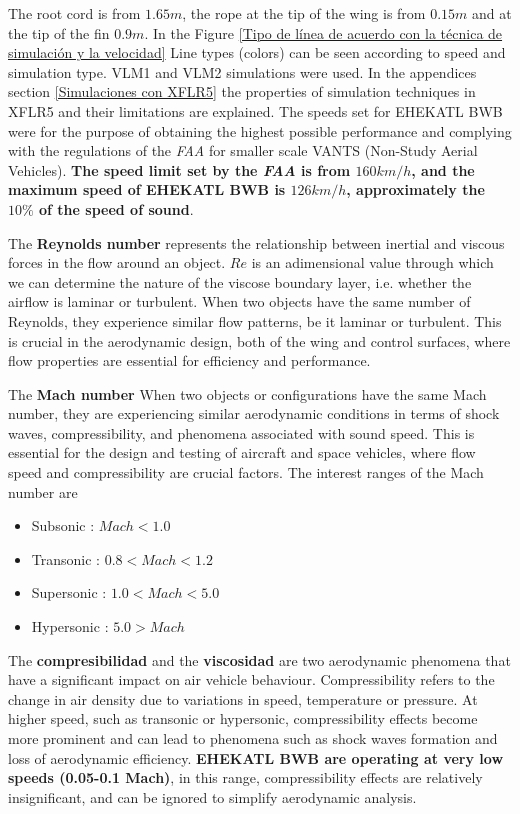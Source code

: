 The root cord is from $1.65m$, the rope at the tip of the wing is from $0.15m$ and at the tip of the fin $0.9m$.
%
In the Figure \ref{Tipo de línea de acuerdo con la técnica de simulación y la velocidad} Line types (colors) can be seen according to speed and simulation type. VLM1 and VLM2 simulations were used. In the appendices section \ref{Simulaciones con XFLR5} the properties of simulation techniques in XFLR5 and their limitations are explained. The speeds set for EHEKATL BWB were for the purpose of obtaining the highest possible performance and complying with the regulations of the \textit{FAA} for smaller scale VANTS (Non-Study Aerial Vehicles). 
\textbf{The speed limit set by the \textit{FAA} is from $160km/h$, and the maximum speed of EHEKATL BWB is $126km/h$, approximately the $10\%$ of the speed of sound}.



The \textbf{Reynolds number} represents the relationship between inertial and viscous forces in the flow around an object. $Re$ is an adimensional value through which we can determine the nature of the viscose boundary layer, i.e. whether the airflow is laminar or turbulent. When two objects have the same number of Reynolds, they experience similar flow patterns, be it laminar or turbulent. This is crucial in the aerodynamic design, both of the wing and control surfaces, where flow properties are essential for efficiency and performance.

The \textbf{Mach number} When two objects or configurations have the same Mach number, they are experiencing similar aerodynamic conditions in terms of shock waves, compressibility, and phenomena associated with sound speed. This is essential for the design and testing of aircraft and space vehicles, where flow speed and compressibility are crucial factors. The interest ranges of the Mach number are
\begin{itemize}
    \item Subsonic : $Mach < 1.0$
    \item Transonic : $0.8 < Mach < 1.2$
    \item Supersonic : $1.0 < Mach < 5.0$
    \item Hypersonic : $5.0 > Mach$
\end{itemize}

The \textbf{compresibilidad} and the \textbf{viscosidad} are two aerodynamic phenomena that have a significant impact on air vehicle behaviour.
%
Compressibility refers to the change in air density due to variations in speed, temperature or pressure. At higher speed, such as transonic or hypersonic, compressibility effects become more prominent and can lead to phenomena such as shock waves formation and loss of aerodynamic efficiency. \textbf{EHEKATL BWB are operating at very low speeds (0.05-0.1 Mach)}, in this range, compressibility effects are relatively insignificant, and can be ignored to simplify aerodynamic analysis. 

